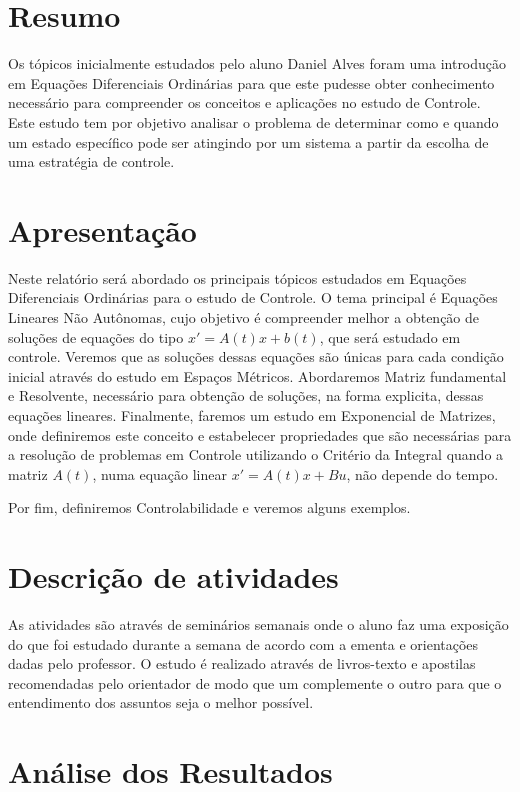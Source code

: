 \documentclass[a4paper, 12pt]{article}
\begin{document}
\newpage
{}
\section{Resumo}

Os tópicos inicialmente estudados pelo aluno Daniel Alves foram uma introdução em Equações Diferenciais Ordinárias para que este pudesse obter conhecimento necessário para compreender os conceitos e aplicações no estudo de Controle. Este estudo tem por objetivo analisar o problema de determinar como e quando um estado específico pode ser atingindo por um sistema a partir da escolha de uma estratégia de controle.

\section{Apresentação}
Neste relatório será abordado os principais tópicos estudados em Equações Diferenciais Ordinárias para o estudo de Controle. O tema principal é Equações Lineares Não Autônomas, cujo objetivo é compreender melhor a obtenção de soluções de equações do tipo $x' = A(t)x + b(t)$, que será estudado em controle. Veremos que as soluções dessas equações são únicas para cada condição inicial através do estudo em Espaços Métricos. Abordaremos Matriz fundamental e Resolvente, necessário para obtenção de soluções, na forma explicita, dessas equações lineares. Finalmente, faremos um estudo em Exponencial de Matrizes, onde definiremos este conceito e estabelecer propriedades que são necessárias para a resolução de problemas em Controle utilizando o Critério da Integral quando a matriz $A(t)$, numa equação linear $x' = A(t)x + Bu$, não depende do tempo.

Por fim, definiremos Controlabilidade e veremos alguns exemplos.

\section{Descrição de atividades}
As atividades são através de seminários semanais onde o aluno faz uma exposição do que foi estudado durante a semana de acordo com a ementa  e orientações dadas pelo professor.
O estudo é realizado através de livros-texto e apostilas recomendadas pelo orientador de modo que um complemente o outro para que o entendimento dos assuntos seja o melhor possível. 

\section{Análise dos Resultados}
\end{document}
